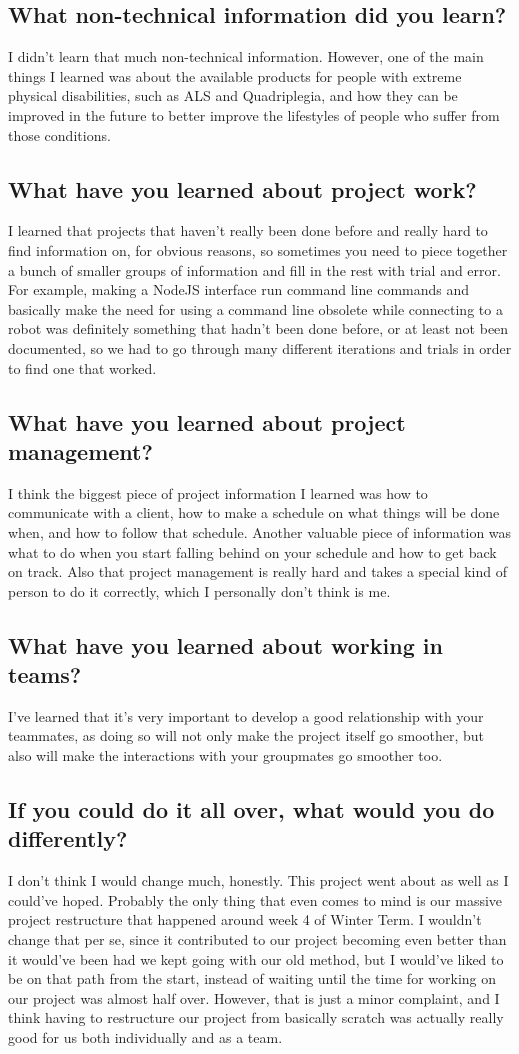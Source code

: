 \documentclass[onecolumn, draftclsnofoot,10pt, compsoc]{report}
\begin{document}
\subsection{What non-technical information did you learn?}
I didn't learn that much non-technical information. However, one of the main things I learned was about the available products for people with extreme physical disabilities, such as ALS and Quadriplegia, and how they can be improved in the future to better improve the lifestyles of people who suffer from those conditions.
\subsection{What have you learned about project work?}
I learned that projects that haven't really been done before and really hard to find information on, for obvious reasons, so sometimes you need to piece together a bunch of smaller groups of information and fill in the rest with trial and error. For example, making a NodeJS interface run command line commands and basically make the need for using a command line obsolete while connecting to a robot was definitely something that hadn't been done before, or at least not been documented, so we had to go through many different iterations and trials in order to find one that worked.
\subsection{What have you learned about project management?}
I think the biggest piece of project information I learned was how to communicate with a client, how to make a schedule on what things will be done when, and how to follow that schedule. Another valuable piece of information was what to do when you start falling behind on your schedule and how to get back on track. Also that project management is really hard and takes a special kind of person to do it correctly, which I personally don't think is me.
\subsection{What have you learned about working in teams?}
I've learned that it's very important to develop a good relationship with your teammates, as doing so will not only make the project itself go smoother, but also will make the interactions with your groupmates go smoother too.
\subsection{If you could do it all over, what would you do differently?}
I don't think I would change much, honestly. This project went about as well as I could've hoped. Probably the only thing that even comes to mind is our massive project restructure that happened around week 4 of Winter Term. I wouldn't change that per se, since it contributed to our project becoming even better than it would've been had we kept going with our old method, but I would've liked to be on that path from the start, instead of waiting until the time for working on our project was almost half over. However, that is just a minor complaint, and I think having to restructure our project from basically scratch was actually really good for us both individually and as a team.
\end{document}

